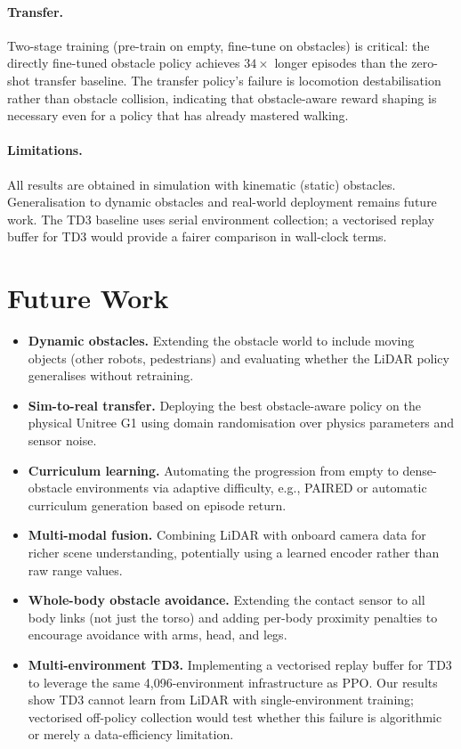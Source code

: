 \documentclass{article}
\begin{document}
\paragraph{Transfer.}
Two-stage training (pre-train on empty, fine-tune on obstacles) is critical:
the directly fine-tuned obstacle policy achieves $34\times$ longer episodes
than the zero-shot transfer baseline. The transfer policy's failure is
locomotion destabilisation rather than obstacle collision, indicating that
obstacle-aware reward shaping is necessary even for a policy that has already
mastered walking.

\paragraph{Limitations.}
All results are obtained in simulation with kinematic (static) obstacles.
Generalisation to dynamic obstacles and real-world deployment remains future
work.
The TD3 baseline uses serial environment collection; a vectorised replay
buffer for TD3 would provide a fairer comparison in wall-clock terms.

\section{Future Work}

\begin{itemize}
  \item \textbf{Dynamic obstacles.} Extending the obstacle world to include
        moving objects (other robots, pedestrians) and evaluating whether the
        LiDAR policy generalises without retraining.
  \item \textbf{Sim-to-real transfer.} Deploying the best obstacle-aware
        policy on the physical Unitree G1 using domain randomisation over
        physics parameters and sensor noise.
  \item \textbf{Curriculum learning.} Automating the progression from empty
        to dense-obstacle environments via adaptive difficulty, e.g., PAIRED
        \cite{dennis2020emergent} or automatic curriculum generation based on
        episode return.
  \item \textbf{Multi-modal fusion.} Combining LiDAR with onboard camera data
        for richer scene understanding, potentially using a learned encoder
        rather than raw range values.
  \item \textbf{Whole-body obstacle avoidance.} Extending the contact sensor
        to all body links (not just the torso) and adding per-body proximity
        penalties to encourage avoidance with arms, head, and legs.
  \item \textbf{Multi-environment TD3.} Implementing a vectorised replay
        buffer for TD3 to leverage the same 4{,}096-environment
        infrastructure as PPO. Our results show TD3 cannot learn from LiDAR
        with single-environment training; vectorised off-policy collection
        would test whether this failure is algorithmic or merely a
        data-efficiency limitation.
\end{itemize}
\end{document}
